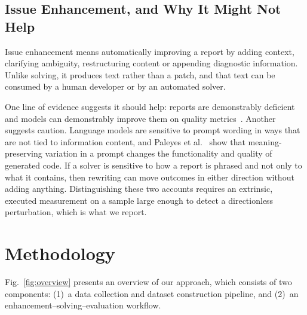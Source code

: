 \documentclass[journal]{IEEEtran}
\begin{document}
\subsection{Issue Enhancement, and Why It Might Not Help}

Issue enhancement means automatically improving a report by adding context, clarifying
ambiguity, restructuring content or appending diagnostic information. Unlike solving, it
produces text rather than a patch, and that text can be consumed by a human developer or by an
automated solver.

One line of evidence suggests it should help: reports are demonstrably
deficient~\cite{bettenburg2008what, zimmermann2010what} and models can demonstrably improve
them on quality metrics~\cite{acharya2025bugreport}. Another suggests caution. Language models
are sensitive to prompt wording in ways that are not tied to information content, and Paleyes
et al.~\cite{paleyes2025coderoulette} show that meaning-preserving variation in a prompt
changes the functionality and quality of generated code. If a solver is sensitive to how a
report is phrased and not only to what it contains, then rewriting can move outcomes in either
direction without adding anything. Distinguishing these two accounts requires an extrinsic,
executed measurement on a sample large enough to detect a directionless perturbation, which is
what we report.


\section{Methodology}
\label{sec:methodology}

Fig.~\ref{fig:overview} presents an overview of our approach, which consists of two components: (1)~a data collection and dataset construction pipeline, and (2)~an enhancement--solving--evaluation workflow.
\end{document}
